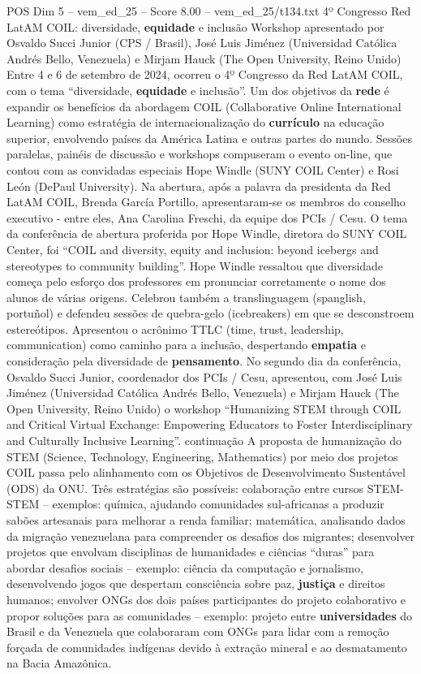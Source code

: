 \begin{textsample}{POS Dim 5 – vem\_ed\_25 – Score 8.00 – vem\_ed\_25/t134.txt}  \label{ex:f5_pos_019}
4º Congresso Red LatAM COIL: diversidade, \textbf{equidade} e inclusão Workshop apresentado por Osvaldo Succi Junior (CPS / Brasil), José Luis Jiménez (Universidad Católica Andrés Bello, Venezuela) e Mirjam Hauck (The Open University, Reino Unido) Entre 4 e 6 de setembro de 2024, ocorreu o 4º Congresso da Red LatAM COIL, com o tema “diversidade, \textbf{equidade} e inclusão”.
Um dos objetivos da \textbf{rede} é expandir os benefícios da abordagem COIL (Collaborative Online International Learning) como estratégia de internacionalização do \textbf{currículo} na educação superior, envolvendo países da América Latina e outras partes do mundo.
Sessões paralelas, painéis de discussão e workshops compuseram o evento on-line, que contou com as convidadas especiais Hope Windle (SUNY COIL Center) e Rosi León (DePaul University).
Na abertura, após a palavra da presidenta da Red LatAM COIL, Brenda García Portillo, apresentaram-se os membros do conselho executivo - entre eles, Ana Carolina Freschi, da equipe dos PCIs / Cesu.
O tema da conferência de abertura proferida por Hope Windle, diretora do SUNY COIL Center, foi “COIL and diversity, equity and inclusion: beyond icebergs and stereotypes to community building”.
Hope Windle ressaltou que diversidade começa pelo esforço dos professores em pronunciar corretamente o nome dos alunos de várias origens.
Celebrou também a translinguagem (spanglish, portuñol) e defendeu sessões de quebra-gelo (icebreakers) em que se desconstroem estereótipos.
Apresentou o acrônimo TTLC (time, trust, leadership, communication) como caminho para a inclusão, despertando \textbf{empatia} e consideração pela diversidade de \textbf{pensamento}.
No segundo dia da conferência, Osvaldo Succi Junior, coordenador dos PCIs / Cesu, apresentou, com José Luis Jiménez (Universidad Católica Andrés Bello, Venezuela) e Mirjam Hauck (The Open University, Reino Unido) o workshop “Humanizing STEM through COIL and Critical Virtual Exchange: Empowering Educators to Foster Interdisciplinary and Culturally Inclusive Learning”. continuação A proposta de humanização do STEM (Science, Technology, Engineering, Mathematics) por meio dos projetos COIL passa pelo alinhamento com os Objetivos de Desenvolvimento Sustentável (ODS) da ONU.
Três estratégias são possíveis: colaboração entre cursos STEM-STEM – exemplos: química, ajudando comunidades sul-africanas a produzir sabões artesanais para melhorar a renda familiar; matemática, analisando dados da migração venezuelana para compreender os desafios dos migrantes; desenvolver projetos que envolvam disciplinas de humanidades e ciências “duras” para abordar desafios sociais – exemplo: ciência da computação e jornalismo, desenvolvendo jogos que despertam consciência sobre paz, \textbf{justiça} e direitos humanos; envolver ONGs dos dois países participantes do projeto colaborativo e propor soluções para as comunidades – exemplo: projeto entre \textbf{universidades} do Brasil e da Venezuela que colaboraram com ONGs para lidar com a remoção forçada de comunidades indígenas devido à extração mineral e ao desmatamento na Bacia Amazônica.

\end{textsample}
